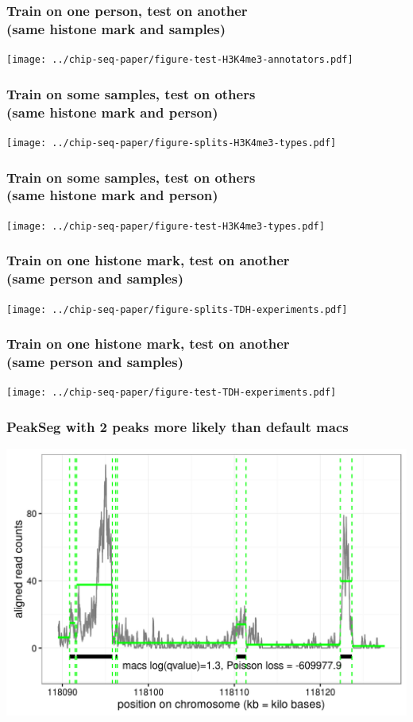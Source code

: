 \documentclass{beamer}
\begin{document}
\begin{frame}
  \frametitle{Train on one person, test on another\\
(same histone mark and samples)}
  \texttt{[image: ../chip-seq-paper/figure-test-H3K4me3-annotators.pdf]}
\end{frame}

\begin{frame}
  \frametitle{Train on some samples, test on others\\
(same histone mark and person)}
  \texttt{[image: ../chip-seq-paper/figure-splits-H3K4me3-types.pdf]}
\end{frame}

\begin{frame}
  \frametitle{Train on some samples, test on others\\
(same histone mark and person)}
  \texttt{[image: ../chip-seq-paper/figure-test-H3K4me3-types.pdf]}
\end{frame}

\begin{frame}
  \frametitle{Train on one histone mark, test on another\\
(same person and samples)}
  \texttt{[image: ../chip-seq-paper/figure-splits-TDH-experiments.pdf]}
\end{frame}

\begin{frame}
  \frametitle{Train on one histone mark, test on another\\
(same person and samples)}
  \texttt{[image: ../chip-seq-paper/figure-test-TDH-experiments.pdf]}
\end{frame}


\begin{frame}
  \frametitle{PeakSeg with 2 peaks more likely than default macs}
  \includegraphics[width=1\textwidth]{figure-macs-problem-1-30103.png}
\end{frame}
\end{document}
